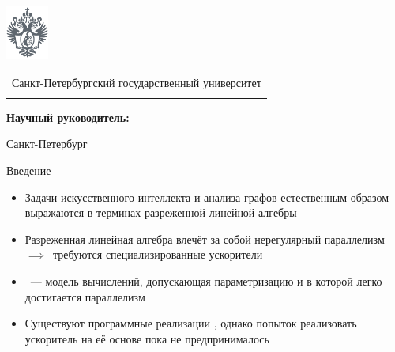 \documentclass
  [ russian
  , aspectratio=169 %
  ] {beamer}
\title[Lamagraph: Транслятор в Interaction Nets]{\my@title@title@ru}
\author[\my@title@author@ru]{\my@title@author@ru, группа \academicGroup}
\institute[СПбГУ]{}
\date[13 марта 2025 г.]{}
\makeatletter
\newcommand{\advisorChair}{\my@title@chair@ru}
\newcommand{\supervisor}{\my@title@supervisor@ru}
\newcommand{\supervisorPosition}{\my@title@supervisorPosition@ru}
\newcommand{\consultant}{\my@title@consultant@ru}
\newcommand{\consultantPosition}{\my@title@consultantPosition@ru}
\newcommand{\reviewer}{\my@title@reviewer@ru}
\newcommand{\reviewerPosition}{\my@title@reviewerPosition@ru}
\newcommand{\defenseYear}{\my@title@year@ru}
\makeatother
\begin{document}
{
\begin{frame}
    \includegraphics[width=1.4cm]{figures/герб_серый.png}
    \vspace{-35pt}
    \hspace{-10pt}
    \begin{center}
        \begin{tabular}{c}
            \scriptsize{Санкт-Петербургский государственный университет} \\
            \scriptsize{\advisorChair}
        \end{tabular}
        \titlepage
    \end{center}

    \btVFill

    {\scriptsize
        \textbf{Научный руководитель:}  \supervisorPosition~\supervisor \\
    }
    \makeatother
    \begin{center}
        \vspace{5pt}
        \scriptsize{Санкт-Петербург\\ \defenseYear}
    \end{center}
\end{frame}
}

\begin{frame}{Введение}
    \begin{itemize}
        \item Задачи искусственного интеллекта и анализа графов естественным образом выражаются в терминах разреженной линейной алгебры
        \item Разреженная линейная алгебра влечёт за собой нерегулярный параллелизм $\implies$~требуются специализированные ускорители
        \item \INs{}~--- модель вычислений, допускающая параметризацию и в которой легко достигается параллелизм
        \item Существуют программные реализации \INs{}, однако попыток реализовать ускоритель на её основе пока не предпринималось
    \end{itemize}

\end{frame}
\end{document}
